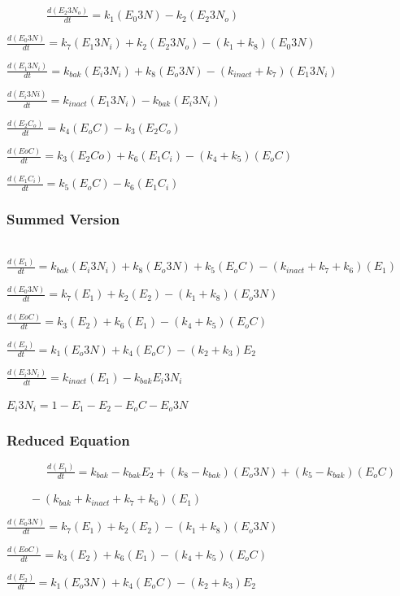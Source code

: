 ~~~~~~~$\frac{d({E_{2}3N_{o}})}{dt} = k_{1}({E_{0}3N}) - k_{2}({E_{2}3N_{o}})$

$\frac{d({E_{0}3N})}{dt} = k_{7}({E_{1}3N_{i}}) + k_{2}({E_{2}3N_{o}})-(k_{1}+k_{8})(E_{0}3N)$

$\frac{d({E_{1}3N_{i}})}{dt} = k_{bak}({E_{i}3N_{i}}) + k_{8}({E_{o}3N})-(k_{inact}+k_{7})(E_{1}3N_{i})$

$\frac{d({E_{i}3Ni})}{dt} = k_{inact}(E_{1}3N_{i}) - k_{bak}(E_{i}3N_{i}) $

$\frac{d(E_{2}C_{o})}{dt} = k_{4} (E_{o}C) - k_{3}(E_{2}C_{o})$

$\frac{d({EoC})}{dt} = k_{3}(E_{2}Co) + k_{6}(E_{1}C_{i}) - (k_{4} + k_{5}) (E_{o}C)$

$\frac{d({E_{1}C_{i}})}{dt} = k_{5}(E_{o}C) - k_{6}(E_{1}C_{i})$


\subsubsection{Summed Version}

~~~~~~~$\frac{d(E_{1})}{dt} = k_{bak}(E_{i}3N_{i})+ k_{8}(E_{o}3N)+k_{5}(E_{o}C)- (k_{inact}+k_{7}+ k_{6})(E_{1})$

$\frac{d({E_{0}3N})}{dt} = k_{7}(E_{1}) + k_{2}(E_{2})-(k_{1}+k_{8})(E_{o}3N)$

$\frac{d({EoC})}{dt} = k_{3}(E_{2}) + k_{6}(E_{1}) - (k_{4} + k_{5}) (E_{o}C)$

$\frac{d(E_{2})}{dt} = k_{1}(E_{o}3N) + k_{4}(E_{o}C) - (k_{2}+k_{3})E_{2}$

$\frac{d(E_{i}3N_{i})}{dt} = k_{inact}(E_{1})-k_{bak}E_{i}3N_{i}$

$E_{i}3N_{i} = 1 - E_{1} -E_{2} - E_{o}C - E_{o}3N$


\subsubsection{Reduced Equation}

~~~~~~~$\frac{d(E_{1})}{dt} = k_{bak} - k_{bak} E_{2}+(k_{8}-k_{bak})(E_{o}3N)+(k_{5}-k_{bak})(E_{o}C)$

$~~~~~~~~~ - (k_{bak}+k_{inact}+k_{7}+ k_{6})(E_{1})$

$\frac{d({E_{0}3N})}{dt} = k_{7}(E_{1}) + k_{2}(E_{2})-(k_{1}+k_{8})(E_{o}3N)$

$\frac{d({EoC})}{dt} = k_{3}(E_{2}) + k_{6}(E_{1}) - (k_{4} + k_{5}) (E_{o}C)$

$\frac{d(E_{2})}{dt} = k_{1}(E_{o}3N) + k_{4}(E_{o}C) - (k_{2}+k_{3})E_{2}$

